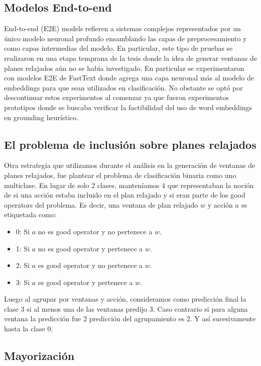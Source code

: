 \subsection{Modelos End-to-end}

End-to-end (E2E) models refieren a sistemas complejos representados por un único
modelo neuronal profundo ensamblando las capas de preprocesamiento y como capas
intermedias del modelo. En particular, este tipo de pruebas se realizaron en una
etapa temprana de la tesis donde la idea de generar ventanas de planes relajados
aún no se había investigado. En particular se experimentaron con modelos E2E de
FastText donde agrega una capa neuronal más al modelo de embeddings para que
sean utilizados en clasificación. No obstante se optó por descontinuar estos
experimentos al comenzar ya que fueron experimentos prototipos donde se buscaba
verificar la factibilidad del uso de word embeddings en grounding heurístico.

\subsection{El problema de inclusión sobre planes relajados}

Otra estrategía que utilizamos durante el análisis en la generación de ventanas
de planes relajados, fue plantear el problema de clasificación binaria como uno
multiclase. En lugar de solo 2 clases, manteníamos 4 que representaban la noción
de si una acción estaba incluido en el plan relajado y si eran parte de los good
operators del problema. Es decir, una ventana de plan relajado $w$ y acción $a$
es etiquetada como:

\begin{itemize}
    \item 0: Si $a$ no es good operator y no pertenece a $w$.
    \item 1: Si $a$ no es good operator y pertenece a $w$.
    \item 2: Si $a$ es good operator y no pertenece a $w$.
    \item 3: Si $a$ es good operator y pertenece a $w$.
\end{itemize}

Luego al agrupar por ventanas y acción, consideramos como predicción final la
clase $3$ si al menos una de las ventanas predijo $3$. Caso contrario si para
alguna ventana la predicción fue $2$ predicción del agrupamiento es $2$. Y así
sucesivamente hasta la clase $0$.

\subsection{Mayorización}

